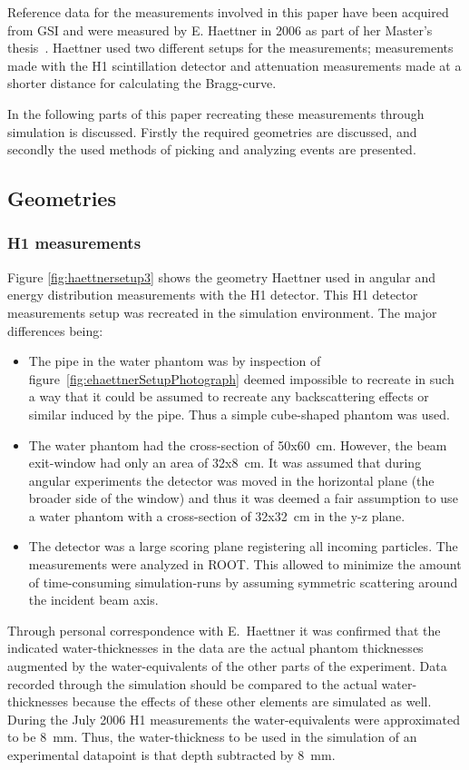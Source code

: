 Reference data for the measurements involved in this paper have been acquired from GSI and were measured by E. Haettner in 2006 as part of her Master's thesis~\cite{ehaettner}. Haettner used two different setups for the measurements; measurements made with the H1 scintillation detector and attenuation measurements made at a shorter distance for calculating the Bragg-curve.

In the following parts of this paper recreating these measurements through simulation is discussed. Firstly the required geometries are discussed, and secondly the used methods of picking and analyzing events are presented.

\subsection{Geometries}

\subsubsection{\label{h1measurements}H1 measurements}

Figure \ref{fig:haettnersetup3} shows the geometry Haettner used in angular and energy distribution measurements with the H1 detector. This H1 detector measurements setup was recreated in the simulation environment. The major differences being:
\begin{itemize}
\item The pipe in the water phantom was by inspection of figure~\ref{fig:ehaettnerSetupPhotograph} deemed impossible to recreate in such a way that it could be assumed to recreate any backscattering effects or similar induced by the pipe. Thus a simple cube-shaped phantom was used.
\item The water phantom had the cross-section of 50x60~cm. However, the beam exit-window had only an area of 32x8~cm. It was assumed that during angular experiments the detector was moved in the horizontal plane (the broader side of the window) and thus it was deemed a fair assumption to use a water phantom with a cross-section of 32x32~cm in the y-z plane. 
\item The detector was a large scoring plane registering all incoming particles. The measurements were analyzed in ROOT. This allowed to minimize the amount of time-consuming simulation-runs by assuming symmetric scattering around the incident beam axis.
\end{itemize}

Through personal correspondence with E.~Haettner it was confirmed that the indicated water-thicknesses in the data are the actual phantom thicknesses augmented by the water-equivalents of the other parts of the experiment. Data recorded through the simulation should be compared to the actual water-thicknesses because the effects of these other elements are simulated as well. During the July 2006 H1 measurements the water-equivalents were approximated to be 8~mm. Thus, the water-thickness to be used in the simulation of an experimental datapoint is that depth subtracted by 8~mm. %

